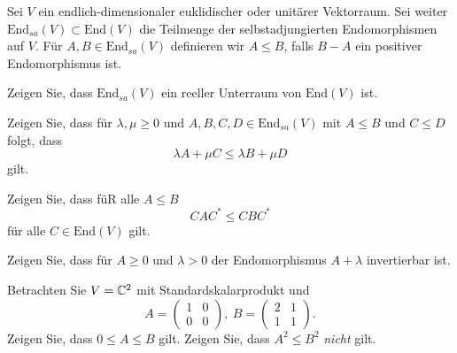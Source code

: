 \begin{Problem}
	Sei $V$ ein endlich-dimensionaler euklidischer oder unitärer Vektorraum. Sei weiter $\text{End}_{sa}(V)\subset \text{End}(V)$ die Teilmenge der selbstadjungierten Endomorphismen auf $V$. F\"{u}r $A,B\in \text{End}_{sa}(V)$ definieren wir $A\le B$, falls $B-A$ ein positiver Endomorphismus ist.
	\begin{parts}
	\item Zeigen Sie, dass $\text{End}_{sa}(V)$ ein reeller Unterraum von $\text{End}(V)$ ist.
	\item Zeigen Sie, dass f\"{u}r $\lambda,\mu\ge 0$ und $A,B,C,D\in \text{End}_{sa}(V)$ mit $A\le B$ und $C\le D$ folgt, dass
		\[
		\lambda A+\mu C\le \lambda B+\mu D
	\]
	gilt.
\item Zeigen Sie, dass f\"{u}R alle $A\le B$ 
	\[
	CAC^*\le CBC^*
\]
f\"{u}r alle $C\in \text{End}(V)$ gilt.
\item Zeigen Sie, dass f\"{u}r $A\ge 0$ und $\lambda>0$ der Endomorphismus $A+\lambda$ invertierbar ist.
\item Betrachten Sie $V=\mathbb{C}^2$ mit Standardskalarprodukt und
	\[
		A=\begin{pmatrix} 1 & 0 \\ 0 & 0 \end{pmatrix} ,~B=\begin{pmatrix} 2 & 1 \\ 1 & 1 \end{pmatrix} 
	.\]
	Zeigen Sie, dass $0\le A \le B$ gilt. Zeigen Sie, dass $A^2\le B^2$ \emph{nicht} gilt.
	\end{parts}
\end{Problem}
